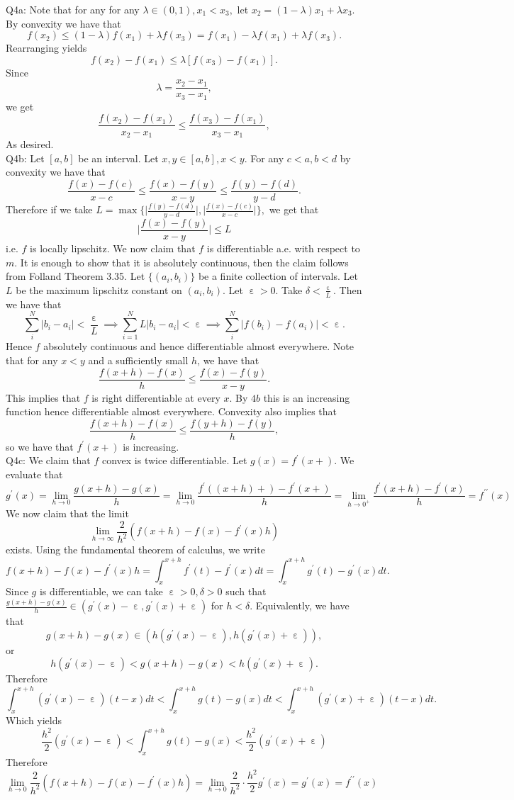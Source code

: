 \documentclass[letterpaper]{article}
\DeclareMathOperator{\ep}{\varepsilon}
\begin{document}
\noindent Q4a: Note that for any for any $\lambda \in (0,1), x_1< x_3,$ let $x_2= (1-\lambda) x_1 + \lambda x_3$. By convexity we have that $$f(x_2) \leq (1-\lambda )f(x_1) + \lambda f(x_3) = f(x_1) - \lambda f(x_1) + \lambda f(x_3).$$ 
Rearranging yields $$f(x_2) - f(x_1) \leq \lambda [f(x_3) - f(x_1)].$$ Since $$\lambda = \frac{x_2-x_1}{x_3 - x_1} ,$$ we get $$\frac{f(x_2)-f(x_1)}{x_2-x_1} \leq \frac{f(x_3) -f(x_1)}{ x_3-x_1},$$ As desired. 
\newline \\ Q4b: Let $[a,b]$ be an interval. Let $x,y\in [a,b], x<y. $ For any $c<a, b<d$ by convexity we have that  $$\frac{f(x)-f(c)}{x-c} \leq \frac{f(x)-f(y)}{x-y} \leq \frac{f(y) - f(d)}{y-d}.$$ Therefore if we take $L = \max \Big\{ \Big| \frac{f(y) - f(d)}{y-d} \Big|, \Big|\frac{f(x)-f(c)}{x-c} \Big| \Big\},$ we get that $$\Big| \frac{f(x) - f(y)}{x-y} \Big| \leq L $$ i.e. $f$ is locally lipschitz. We now claim that $f$ is differentiable a.e. with respect to $m$. It is enough to show that it is absolutely continuous, then the claim follows from Folland Theorem 3.35. Let $\{(a_i,b_i)\}$ be a finite collection of intervals. Let $L$  be the maximum lipschitz constant on $(a_i,b_i)$. Let $\ep>0$. Take $\delta  < \frac{\ep}{L}$. Then we have that 
$$\sum_{i}^N |b_i-a_i| < \frac{\ep}{L} \implies \sum_{i=1}^N L|b_i-a_i| < \ep \implies \sum_{i}^N |f(b_i) - f(a_i)| < \ep . $$
Hence $f$ absolutely continuous and hence differentiable almost everywhere. Note that for any $x<y$ and a sufficiently small $h$, we have that $$\frac{f(x+h)-f(x)}{h} \leq \frac{f(x)-f(y)}{x-y}.$$ This implies that $f$ is right differentiable at every $x$. By $4b$ this is an increasing function hence differentiable almost everywhere. Convexity also implies that $$\frac{f(x+h)-f(x)}{h}\leq \frac{f(y+h)-f(y)}{h},$$ so we have that $f^\prime(x+)$ is increasing. 
\newline \\ Q4c: We claim that $f$ convex is twice differentiable. Let $g(x) = f^\prime(x+).$ We evaluate that $$g^\prime(x) = \lim_{h\to 0} \frac{g(x+h) -g(x)}{h} = \lim_{h\to 0} \frac{f^\prime((x+h)+) - f^\prime(x+)}{h}  = \lim_{h\to 0^+}\frac{f^\prime(x+h) - f^\prime(x)}{h} = f^{\prime \prime }(x)$$ 
We now claim that the limit $$\lim_{h\to \infty} \frac{2}{h^2} (f(x+h) -f(x) -f^\prime(x)h)$$ exists. Using the fundamental theorem of calculus, we write $$f(x+h) -f(x) -f^\prime(x)h = \int_x^{x+h} f^\prime(t) -f^\prime(x) dt = \int_{x}^{x+h} g^\prime(t) - g^\prime(x) dt. $$ Since $g$ is differentiable, we can take $\ep>0,\delta>0$ such that $\frac{g(x+h) - g(x)}{h} \in (g^\prime(x)-\ep, g^\prime(x)+\ep )$ for $h< \delta$. 
Equivalently, we have that $$g(x+h)-g(x) \in (h(g^\prime(x) - \ep), h(g^\prime(x)+\ep)),$$ or $$h(g^\prime(x) - \ep) < g(x+h) - g(x) < h(g^\prime(x) + \ep). $$ 
Therefore $$\int_{x}^{x+h}(g^\prime(x) - \ep) (t-x) dt < \int_{x}^{x+h} g(t) -g(x) dt < \int_{x}^{x+h}(g^\prime(x) + \ep) (t-x) dt.$$ Which yields $$ \frac{h^2}{2} (g^\prime(x) - \ep) < \int_{x}^{x+h} g(t) - g(x) < \frac{h^2}{2}(g^\prime(x) + \ep )$$
Therefore $$\lim_{h\to 0} \frac{2}{h^2} (f(x+h) -f(x) -f^\prime(x)h) = \lim_{h\to 0} \frac{2}{h^2} \cdot  \frac{h^2}{2}g^\prime(x) = g^\prime(x) = f^{\prime \prime}(x)$$
\end{document}
